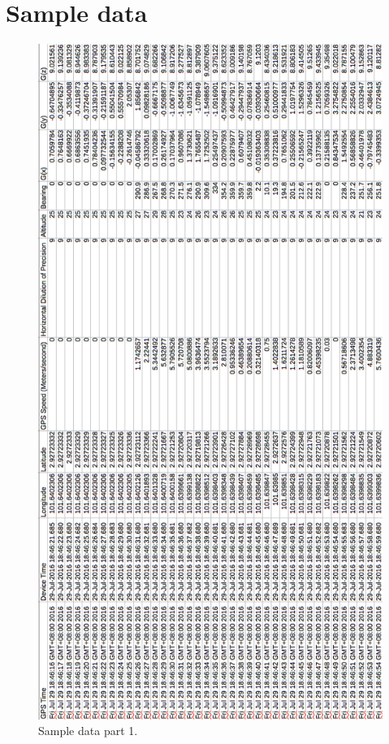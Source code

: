 \chapter{Sample data}

\begin{figure}[hbt!]\centering
\includegraphics[scale=0.6]{image/sample1}
\caption{Sample data part 1.}
\end{figure}

